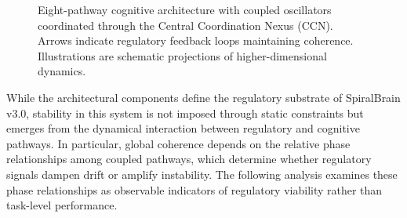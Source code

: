 \documentclass[12pt,a4paper]{report}
\begin{document}
\begin{figure}[H]
\centering
{}
\caption{
Eight-pathway cognitive architecture with coupled oscillators coordinated
through the Central Coordination Nexus (CCN). Arrows indicate regulatory
feedback loops maintaining coherence. Illustrations are schematic projections
of higher-dimensional dynamics.
}
\label{fig:pathways}
\end{figure}


While the architectural components define the regulatory substrate of SpiralBrain v3.0, stability in this system is not imposed through static constraints but emerges from the dynamical interaction between regulatory and cognitive pathways. In particular, global coherence depends on the relative phase relationships among coupled pathways, which determine whether regulatory signals dampen drift or amplify instability. The following analysis examines these phase relationships as observable indicators of regulatory viability rather than task-level performance.
\end{document}

